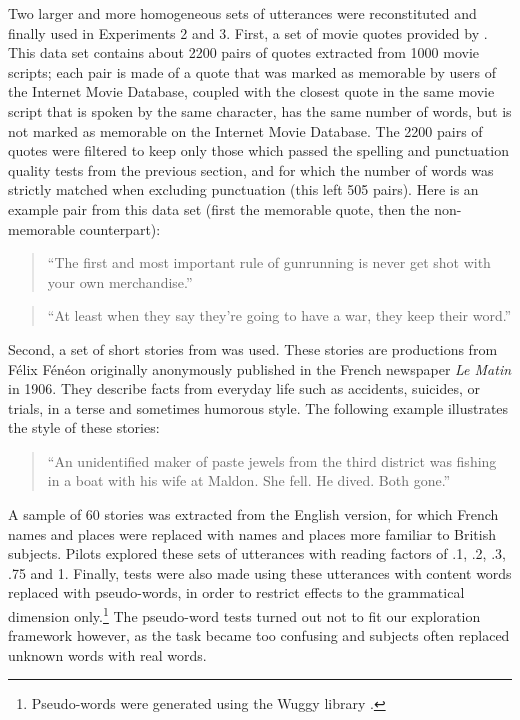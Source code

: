 \documentclass[a4paper,fleqn]{cas-dc}
\begin{document}
Two larger and more homogeneous sets of utterances were reconstituted
and finally used in Experiments 2 and 3. First, a set of movie quotes
provided by \citet{danescu-niculescu-mizil_you_2012}. This data set
contains about 2200 pairs of quotes extracted from 1000 movie scripts;
each pair is made of a quote that was marked as memorable by users of
the Internet Movie Database, coupled with the closest quote in the same
movie script that is spoken by the same character, has the same number
of words, but is not marked as memorable on the Internet Movie Database.
The 2200 pairs of quotes were filtered to keep only those which passed
the spelling and punctuation quality tests from the previous section,
and for which the number of words was strictly matched when excluding
punctuation (this left 505 pairs). Here is an example pair from this
data set (first the memorable quote, then the non-memorable
counterpart):

\begin{quote}
\enquote{The first and most important rule of gunrunning is never get
shot with your own merchandise.}
\end{quote}

\begin{quote}
\enquote{At least when they say they're going to have a war, they keep
their word.}
\end{quote}

Second, a set of short stories from \citet{feneon_novels_2007} was
used. These stories are productions from Félix Fénéon originally
anonymously published in the French newspaper \emph{Le Matin} in 1906.
They describe facts from everyday life such as accidents, suicides, or
trials, in a terse and sometimes humorous style. The following example
illustrates the style of these stories:

\begin{quote}
\enquote{An unidentified maker of paste jewels from the third district
was fishing in a boat with his wife at Maldon. She fell. He dived. Both
gone.}
\end{quote}

A sample of 60 stories was extracted from the English version, for which
French names and places were replaced with names and places more
familiar to British subjects. Pilots explored these sets of utterances
with reading factors of .1, .2, .3, .75 and 1. Finally, tests were also
made using these utterances with content words replaced with
pseudo-words, in order to restrict effects to the grammatical dimension
only.\footnote{Pseudo-words were generated using the Wuggy library
  \citep{keuleers_wuggy:_2010}.} The pseudo-word tests turned out not
to fit our exploration framework however, as the task became too
confusing and subjects often replaced unknown words with real words.
\end{document}

